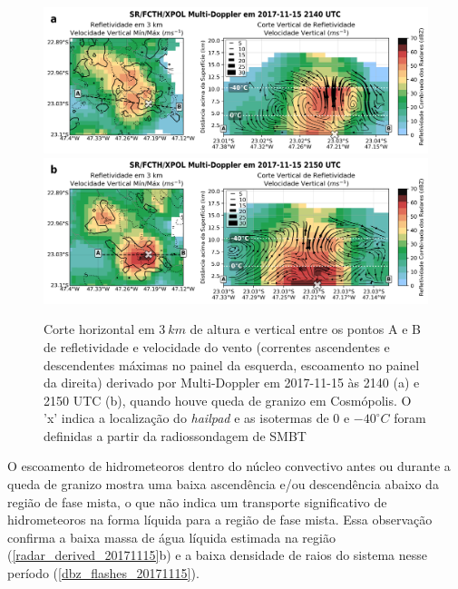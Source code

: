 \begin{figure}[htb]
	\centering
	\caption{Corte horizontal em $3\:km$ de altura e vertical entre os pontos A e B de refletividade e velocidade do vento (correntes ascendentes e descendentes máximas no painel da esquerda, escoamento no painel da direita) derivado por Multi-Doppler em 2017-11-15 às 2140 (a) e 2150 UTC (b), quando houve queda de granizo em Cosmópolis. O 'x' indica a localização do \textit{hailpad} e as isotermas de $0$ e $-40^{\circ}C$ foram definidas a partir da radiossondagem de SMBT} 
	\label{doppler_20171115}
	\vspace{-5pt}
	\includegraphics[width=\columnwidth]{../MultiDoppler_Processing/figures/SR-FCTH-XPOL 2017-11-15 2140 UTC_ptbr.png} \\
	\vspace{-5pt}
	\includegraphics[width=\columnwidth]{../MultiDoppler_Processing/figures/SR-FCTH-XPOL 2017-11-15 2150 UTC_ptbr.png} \\
\end{figure}

O escoamento de hidrometeoros dentro do núcleo convectivo antes ou durante a queda de granizo mostra uma baixa ascendência e/ou descendência abaixo da região de fase mista, o que não indica um transporte significativo de hidrometeoros na forma líquida para a região de fase mista. Essa observação confirma a baixa massa de água líquida estimada na região (\autoref{radar_derived_20171115}b) e a baixa densidade de raios do sistema nesse período (\autoref{dbz_flashes_20171115}).